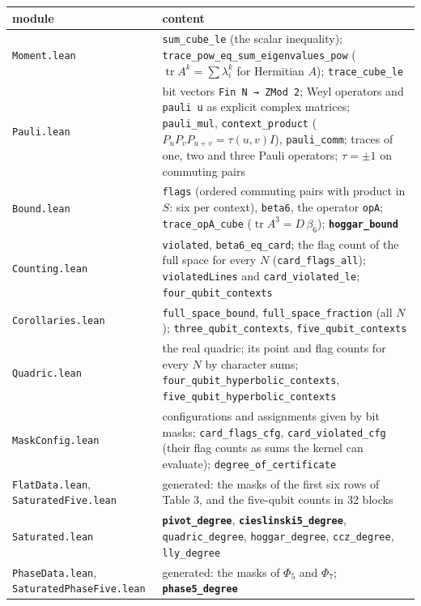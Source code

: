 \documentclass[11pt,a4paper]{article}
\begin{document}
{\def\LTcaptype{none} %
{\small
\begin{longtable}[]{@{}>{\raggedright\arraybackslash}p{}>{\raggedright\arraybackslash}p{}@{}}
\toprule\noalign{}
module & content \\
\midrule\noalign{}
\endhead
\bottomrule\noalign{}
\endlastfoot
\texttt{Moment.lean} & \texttt{sum\_cube\_le} (the scalar inequality); \texttt{trace\_pow\_eq\_sum\_eigenvalues\_pow} (\(\operatorname{tr}A^k = \sum \lambda_i^k\) for Hermitian \(A\)); \texttt{trace\_cube\_le} \\
\texttt{Pauli.lean} & bit vectors \texttt{Fin\ N\ →\ ZMod\ 2}; Weyl operators and \texttt{pauli\ u} as explicit complex matrices; \texttt{pauli\_mul}, \texttt{context\_product} (\(P_uP_vP_{u+v} = \tau(u,v) I\)), \texttt{pauli\_comm}; traces of one, two and three Pauli operators; \(\tau = \pm 1\) on commuting pairs \\
\texttt{Bound.lean} & \texttt{flags} (ordered commuting pairs with product in \(S\): six per context), \texttt{beta6}, the operator \texttt{opA}; \texttt{trace\_opA\_cube} (\(\operatorname{tr}A^3 = D\,\beta_6\)); \textbf{\texttt{hoggar\_bound}} \\
\texttt{Counting.lean} & \texttt{violated}, \texttt{beta6\_eq\_card}; the flag count of the full space for every \(N\) (\texttt{card\_flags\_all}); \texttt{violatedLines} and \texttt{card\_violated\_le}; \texttt{four\_qubit\_contexts} \\
\texttt{Corollaries.lean} & \texttt{full\_space\_bound}, \texttt{full\_space\_fraction} (all \(N\)); \texttt{three\_qubit\_contexts}, \texttt{five\_qubit\_contexts} \\
\texttt{Quadric.lean} & the real quadric; its point and flag counts for every \(N\) by character sums; \texttt{four\_qubit\_hyperbolic\_contexts}, \texttt{five\_qubit\_hyperbolic\_contexts} \\
\texttt{MaskConfig.lean} & configurations and assignments given by bit masks; \texttt{card\_flags\_cfg}, \texttt{card\_violated\_cfg} (their flag counts as sums the kernel can evaluate); \texttt{degree\_of\_certificate} \\
\texttt{FlatData.lean}, \texttt{SaturatedFive.lean} & generated: the masks of the first six rows of Table 3, and the five-qubit counts in 32 blocks \\
\texttt{Saturated.lean} & \textbf{\texttt{pivot\_degree}}, \textbf{\texttt{cieslinski5\_degree}}, \texttt{quadric\_degree}, \texttt{hoggar\_degree}, \texttt{ccz\_degree}, \texttt{lly\_degree} \\
\texttt{PhaseData.lean}, \texttt{SaturatedPhaseFive.lean} & generated: the masks of \(\Phi_5\) and \(\Phi_7\); \textbf{\texttt{phase5\_degree}} \\
\end{longtable}
}
}
\end{document}
